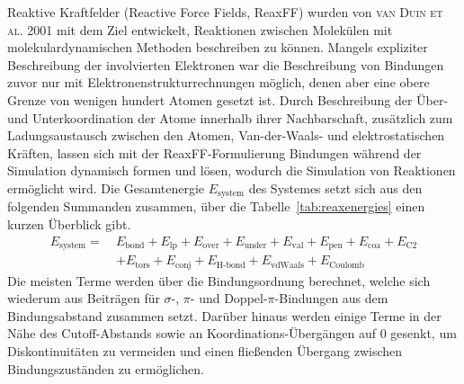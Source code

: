 Reaktive Kraftfelder (Reactive Force Fields, ReaxFF) wurden von \textsc{van Duin et al.}\cite{van_duin_reaxff:_2001} 2001 mit dem Ziel entwickelt, Reaktionen zwischen Molekülen mit molekulardynamischen Methoden beschreiben zu können.
Mangels expliziter Beschreibung der involvierten Elektronen war die Beschreibung von Bindungen zuvor nur mit Elektronenstrukturrechnungen möglich, denen aber eine obere Grenze von wenigen hundert Atomen gesetzt ist.
Durch Beschreibung der Über- und Unterkoordination der Atome innerhalb ihrer Nachbarschaft, zusätzlich zum Ladungsaustausch zwischen den Atomen, Van-der-Waals- und elektrostatischen Kräften, lassen sich mit der ReaxFF-Formulierung Bindungen während der Simulation dynamisch formen und lösen, wodurch die Simulation von Reaktionen ermöglicht wird.
Die Gesamtenergie $E_\text{system}$ des Systemes setzt sich aus den folgenden Summanden zusammen, über die Tabelle~\ref{tab:reaxenergies} einen kurzen Überblick gibt.
\begin{align}
  \label{reaxformulation}
  E_\text{system} =~& E_\text{bond} + E_\text{lp} + E_\text{over} + E_\text{under} + E_\text{val} + E_\text{pen} + E_\text{coa} + E_\text{C2} \\
  \nonumber  & + E_\text{tors} + E_\text{conj} + E_\text{H-bond} + E_\text{vdWaals} + E_\text{Coulomb}
\end{align}
Die meisten Terme werden über die Bindungsordnung berechnet, welche sich wiederum aus Beiträgen für $\sigma$-, $\pi$- und Doppel-$\pi$-Bindungen aus dem Bindungsabstand zusammen setzt.
Darüber hinaus werden einige Terme in der Nähe des Cutoff-Abstands sowie an Koordinations-Übergängen auf 0 gesenkt, um Diskontinuitäten zu vermeiden und einen fließenden Übergang zwischen Bindungszuständen zu ermöglichen.

